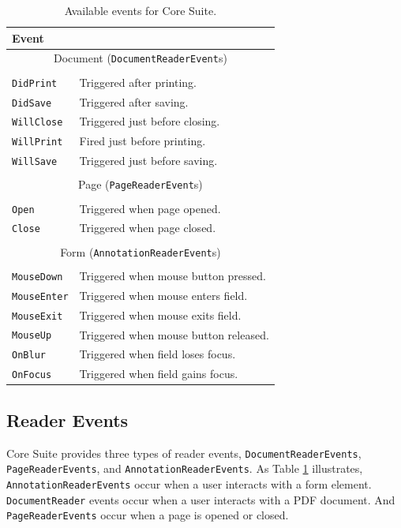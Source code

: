 \documentclass[american]{tufte-book}
\providecommand{\tabularnewline}{\\}
\numberwithin{equation}{section}
\numberwithin{figure}{section}
\begin{document}
{\begin{table}[h]
\begin{tabular}{ll}
\toprule 
{\small Event} & \tabularnewline
\midrule
\multicolumn{2}{c}{{\small Document (}{\small\texttt{DocumentReaderEvent}}{\small s)}}\tabularnewline
 & \tabularnewline
{\small\texttt{DidPrint}} & {\small Triggered after printing.}\tabularnewline
{\small\texttt{DidSave}} & {\small Triggered after saving.}\tabularnewline
{\small\texttt{WillClose}} & {\small Triggered just before closing.}\tabularnewline
{\small\texttt{WillPrint}} & {\small Fired just before printing.}\tabularnewline
{\small\texttt{WillSave}} & {\small Triggered just before saving.}\tabularnewline
 & \tabularnewline
\multicolumn{2}{c}{{\small Page (}{\small\texttt{PageReaderEvent}}{\small s)}}\tabularnewline
 & \tabularnewline
{\small\texttt{Open}} & {\small Triggered when page opened.}\tabularnewline
{\small\texttt{Close}} & {\small Triggered when page closed.}\tabularnewline
 & \tabularnewline
\multicolumn{2}{c}{{\small Form (}{\small\texttt{AnnotationReaderEvent}}{\small s)}}\tabularnewline
 & \tabularnewline
{\small\texttt{MouseDown}} & {\small Triggered when mouse button pressed.}\tabularnewline
{\small\texttt{MouseEnter}} & {\small Triggered when mouse enters field.}\tabularnewline
{\small\texttt{MouseExit}} & {\small Triggered when mouse exits field.}\tabularnewline
{\small\texttt{MouseUp}} & {\small Triggered when mouse button released.}\tabularnewline
{\small\texttt{OnBlur}} & {\small Triggered when field loses focus.}\tabularnewline
{\small\texttt{OnFocus}} & {\small Triggered when field gains focus.}\tabularnewline
\bottomrule
\end{tabular}\caption{Available events for Core Suite.}\label{tab:Available-events-for}

\end{table}


\subsection{Reader Events}

Core Suite provides three types of reader events, \texttt{DocumentReaderEvents},
\texttt{PageReaderEvents}, and \texttt{AnnotationReaderEvents}. As
Table \ref{tab:Available-events-for} illustrates, \texttt{AnnotationReaderEvents}
occur when a user interacts with a form element. \texttt{DocumentReader}
events occur when a user interacts with a PDF document. And \texttt{PageReaderEvents}
occur when a page is opened or closed.

}
\end{document}
